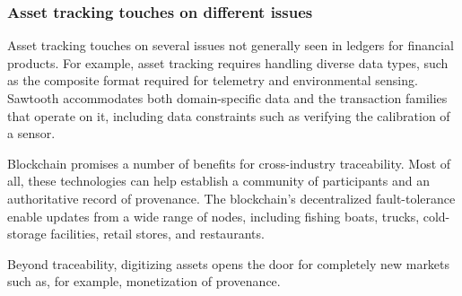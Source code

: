 \subsubsection{Asset tracking touches on different issues}

Asset tracking touches on several issues not generally seen in ledgers
for financial products.  For example, asset tracking requires handling
diverse data types, such as the composite format required for telemetry
and environmental sensing.  Sawtooth accommodates both domain-specific
data and the transaction families that operate on it, including data
constraints such as verifying the calibration of a sensor.

Blockchain promises a number of benefits for cross-industry
traceability.  Most of all, these technologies can help establish a
community of participants and an authoritative record of provenance.
The blockchain's decentralized fault-tolerance enable updates from a
wide range of nodes, including fishing boats, trucks, cold-storage
facilities, retail stores, and restaurants.

Beyond traceability, digitizing assets opens the door for completely new
markets such as, for example, monetization of provenance.
